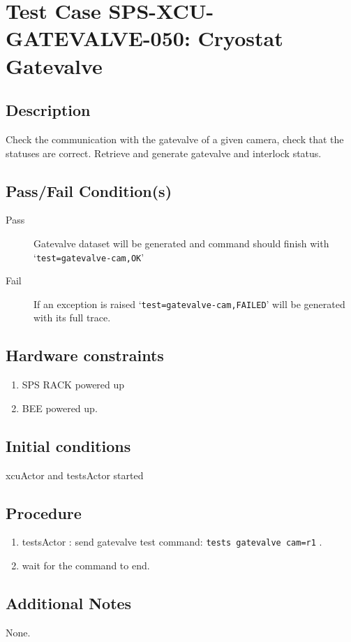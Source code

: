\section{Test Case SPS-XCU-GATEVALVE-050: Cryostat Gatevalve}

\subsection{Description}

Check the communication with the gatevalve of a given camera, check that the statuses are correct.
Retrieve and generate gatevalve and interlock status.

\subsection{Pass/Fail Condition(s)}

\begin{description}
\item [Pass] Gatevalve dataset will be generated and command should finish with `\texttt{test=gatevalve-cam,OK}'
\item [Fail] If an exception is raised `\texttt{test=gatevalve-cam,FAILED}' will be generated with its full trace.

\end{description}

\subsection{Hardware constraints}

\begin{enumerate}
    \item SPS RACK powered up
    \item \acrshort{BEE} powered up.
\end{enumerate}

\subsection{Initial conditions}

xcuActor and testsActor started

\subsection{Procedure}

\begin{enumerate}
    \item testsActor : send gatevalve test command: \texttt{tests gatevalve cam=r1} .
    \item wait for the command to end.
\end{enumerate}

\subsection{Additional Notes}
None.
